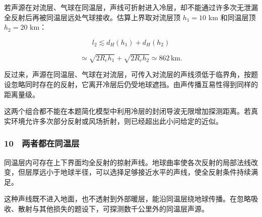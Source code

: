 \documentclass[12pt,a4paper,fontset=fandol]{ctexart}
\begin{document}
若声源在对流层、气球在同温层，声线可折射进入冷层，却不能通过许多次无泄漏全反射后再被同温层远处气球接收。估算上界取对流层顶
\(h_1=10\) km 和同温层顶 \(h_2=20\) km：

\[l_2\lesssim d_H(h_1)+d_H(h_2)\]

\[\simeq\sqrt{2R_eh_1}+\sqrt{2R_eh_2}
\simeq862\,\mathrm{km}.\]

反过来，声源在同温层、气球在对流层，可传入对流层的声线须低于临界角，按题设忽略同时存在的反射，它离开冷层后仍受地球遮挡。由声传播互易性得到同样的距离量级。

这两个组合都不能在本题简化模型中利用冷层的封闭导波无限增加探测距离。若真实环境允许多次部分反射或风场折射，则已经超出此小问给定的近似。

\subsubsection{10　两者都在同温层}\label{ux4e24ux8005ux90fdux5728ux540cux6e29ux5c42}

同温层内可存在上下界面均全反射的掠射声线。地球曲率使各次反射的局部法线改变，但层厚远小于地球半径，可以选择足够接近水平的声线，使全反射条件持续满足。

这种声线既不进入地面，也不透射到外部暖层，能沿同温层绕地球传播。在忽略吸收、散射与其他损失的题设下，可探测数千公里外的同温层声源。

\begin{center}
\begin{minipage}{\linewidth}
\centering\begingroup{}
\ifdim\wd\diagrambox>.88\linewidth
\sbox{\diagrambox}{\resizebox{.88\linewidth}{!}{\usebox{\diagrambox}}}\fi
\ifdim\ht\diagrambox>.38\textheight
\resizebox{!}{.38\textheight}{\usebox{\diagrambox}}
\else\usebox{\diagrambox}\fi
\par{}\endgroup\end{minipage}\end{center}
\end{document}
